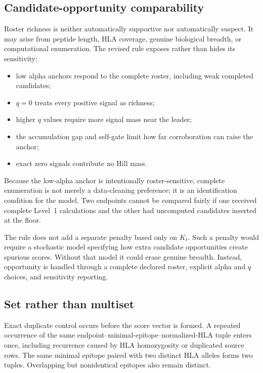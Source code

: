 \documentclass[11pt]{article}
\begin{document}
\subsection{Candidate-opportunity comparability}

Roster richness is neither automatically supportive nor automatically
suspect. It may arise from peptide length, HLA coverage, genuine biological
breadth, or computational enumeration. The revised rule exposes rather than
hides its sensitivity:

\begin{itemize}
  \item low alpha anchors respond to the complete roster, including weak
  completed candidates;
  \item $q=0$ treats every positive signal as richness;
  \item higher $q$ values require more signal mass near the leader;
  \item the accumulation gap and self-gate limit how far corroboration can
  raise the anchor;
  \item exact zero signals contribute no Hill mass.
\end{itemize}

Because the low-alpha anchor is intentionally roster-sensitive, complete
enumeration is not merely a data-cleaning preference; it is an identification
condition for the model. Two endpoints cannot be compared fairly if one
received complete Level~1 calculations and the other had uncomputed candidates
inserted at the floor.

The rule does not add a separate penalty based only on $K_\ell$. Such a
penalty would require a stochastic model specifying how extra candidate
opportunities create spurious scores. Without that model it could erase
genuine breadth. Instead, opportunity is handled through a complete declared
roster, explicit alpha and $q$ choices, and sensitivity reporting.

\subsection{Set rather than multiset}

Exact duplicate control occurs before the score vector is formed. A repeated
occurrence of the same endpoint--minimal-epitope--normalized-HLA tuple enters
once, including recurrence caused by HLA homozygosity or duplicated source
rows. The same minimal epitope paired with two distinct HLA alleles forms two
tuples. Overlapping but nonidentical epitopes also remain distinct.
\end{document}
